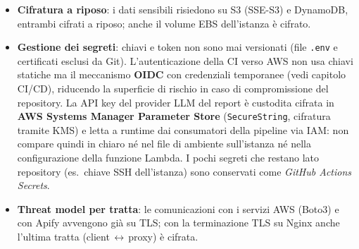 \documentclass[11pt,a4paper]{article}
\begin{document}
\begin{itemize}[nosep]
        automaticamente dal client \textbf{Certbot} sull'host: l'identità del server è
        quindi attestata da una CA riconosciuta e il browser non mostra alcun avviso. Il
        dominio è ancorato all'istanza tramite un \emph{Elastic IP} statico, ed è attiva
        la politica \emph{HSTS} che impone al browser l'uso esclusivo di HTTPS.
  \item \textbf{Cifratura a riposo}: i dati sensibili risiedono su S3 (SSE-S3) e
        DynamoDB, entrambi cifrati a riposo; anche il volume EBS dell'istanza è cifrato.
  \item \textbf{Gestione dei segreti}: chiavi e token non sono mai versionati (file
        \texttt{.env} e certificati esclusi da Git). L'autenticazione della CI
        verso AWS non usa chiavi statiche ma il meccanismo \textbf{OIDC} con credenziali
        temporanee (vedi capitolo CI/CD), riducendo la superficie di rischio in caso di
        compromissione del repository. La API key del provider LLM del report è custodita
        cifrata in \textbf{AWS Systems Manager Parameter Store} (\texttt{SecureString},
        cifratura tramite KMS) e letta a runtime dai consumatori della pipeline via IAM:
        non compare quindi in chiaro né nel file di ambiente sull'istanza né nella
        configurazione della funzione Lambda. I pochi segreti che restano lato repository
        (es.\ chiave SSH dell'istanza) sono conservati come \emph{GitHub Actions Secrets}.
  \item \textbf{Threat model per tratta}: le comunicazioni con i servizi AWS (Boto3) e
        con Apify avvengono già su TLS; con la terminazione TLS su Nginx anche l'ultima
        tratta (client\,$\leftrightarrow$\,proxy) è cifrata.
\end{itemize}
\end{document}
